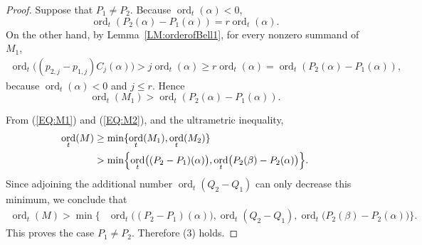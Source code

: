 \documentclass[10pt,a4paper]{amsart}
\DeclareMathOperator{\ord}{ord}
\begin{document}
\begin{proof}
Suppose that $P_1\neq P_2$. Because
$\ord_t(\alpha)<0$,
$$
  \ord_t(P_2(\alpha)-P_1(\alpha))=r\ord_t(\alpha).
$$
On the other hand, by Lemma~\ref{LM:orderofBell1}, for every nonzero summand of $M_1$, 
\[
\begin{aligned}
  \ord_t\bigl((p_{2,j}-p_{1,j})C_j(\alpha)\bigr)
  >j\ord_t(\alpha)
  \geq r\ord_t(\alpha)
   =\ord_t(P_2(\alpha)-P_1(\alpha)),
\end{aligned}
\]
because
$\ord_t(\alpha)<0$ and $j\leq r$. Hence
\begin{equation}
  \label{EQ:M1}
  \ord_t(M_1)> \ord_t(P_2(\alpha)-P_1(\alpha)).
\end{equation}

From (\ref{EQ:M1}) and (\ref{EQ:M2}), and the ultrametric inequality,
\[
\begin{aligned}
  \ord_t(M)
  &\geq \min\{\ord_t(M_1),\ord_t(M_2)\}\\
  &>\min\Bigl\{
      \ord_t\bigl((P_2-P_1)(\alpha)\bigr),
      \ord_t\bigl(P_2(\beta)-P_2(\alpha)\bigr)
     \Bigr\}.
\end{aligned}
\]
Since adjoining the additional number $\ord_t(Q_2-Q_1)$ can only decrease
this minimum, we conclude that
\[
\begin{aligned}
  \ord_t(M)>
  \min\bigl\{&\ord_t\bigl((P_2-P_1)(\alpha)\bigr),
  \ord_t(Q_2-Q_1),
  \ord_t\bigl(P_2(\beta)-P_2(\alpha)\bigr)\bigr\}.
\end{aligned}
\]
This proves the case $P_1\neq P_2$. Therefore (3) holds. 
\end{proof}
\end{document}
